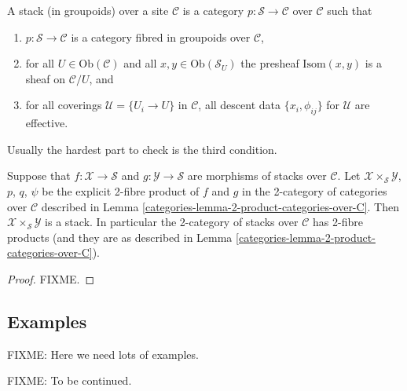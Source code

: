 \begin{definition}
\label{defintion-stack}
A stack (in groupoids) over a site $\mathcal{C}$ is a 
category $p : \mathcal{S} \to \mathcal{C}$ over $\mathcal{C}$
such that
\begin{enumerate}
\item $p : \mathcal{S} \to \mathcal{C}$ is a category fibred 
in groupoids over $\mathcal{C}$, 
\item for all $U \in \text{Ob}(\mathcal{C})$ and all
$x,y\in \text{Ob}(\mathcal{S}_U)$ the presheaf
$\text{Isom}(x,y)$ is a sheaf on $\mathcal{C}/U$, and
\item for all coverings $\mathcal{U}=\{U_i \to U\}$ in $\mathcal{C}$, 
all descent data $\{x_i,\phi_{ij}\}$ for $\mathcal{U}$ are effective.
\end{enumerate}
\end{definition}

\noindent
Usually the hardest part to check is the third condition.

\begin{lemma}
\label{lemma-2-product-stacks}
Suppose that $f : \mathcal{X} \to \mathcal{S}$ and
$g : \mathcal{Y} \to \mathcal{S}$ are morphisms of stacks over
$\mathcal{C}$. Let $\mathcal{X} \times_\mathcal{S}\mathcal{Y}$, $p$, $q$,
$\psi$ be the explicit 2-fibre product of $f$ and $g$ in the 2-category
of categories over $\mathcal{C}$ described in
Lemma \ref{categories-lemma-2-product-categories-over-C}.
Then $\mathcal{X} \times_\mathcal{S}\mathcal{Y}$ is a stack. In particular
the 2-category of stacks over $\mathcal{C}$ has 2-fibre products (and
they are as described in 
Lemma \ref{categories-lemma-2-product-categories-over-C}).
\end{lemma}

\begin{proof}
FIXME.
\end{proof}

\subsection{Examples}
\label{subsection-examples}

\noindent
FIXME: Here we need lots of examples.

\noindent
FIXME: To be continued.









